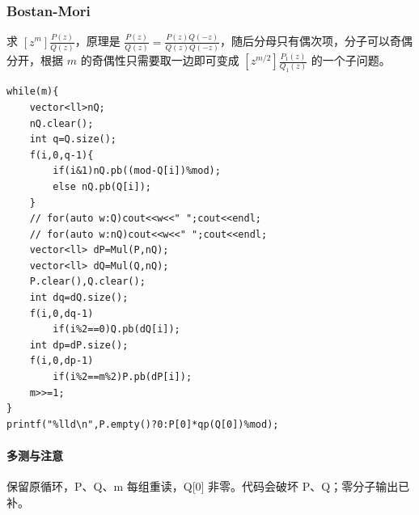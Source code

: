 \subsubsection{Bostan-Mori}

求 $[z^m]\frac{P(z)}{Q(z)}$，原理是 $\frac{P(z)}{Q(z)}=\frac{P(z)Q(-z)}{Q(z)Q(-z)}$，随后分母只有偶次项，分子可以奇偶分开，根据 $m$ 的奇偶性只需要取一边即可变成 $[z^{m/2}]\frac{P_1(z)}{Q_1(z)}$ 的一个子问题。

\begin{lstlisting}
while(m){
	vector<ll>nQ;
	nQ.clear();
	int q=Q.size();
	f(i,0,q-1){
		if(i&1)nQ.pb((mod-Q[i])%mod);
		else nQ.pb(Q[i]);
	}
	// for(auto w:Q)cout<<w<<" ";cout<<endl;
	// for(auto w:nQ)cout<<w<<" ";cout<<endl;
	vector<ll> dP=Mul(P,nQ);
	vector<ll> dQ=Mul(Q,nQ);
	P.clear(),Q.clear();
	int dq=dQ.size();
	f(i,0,dq-1)
		if(i%2==0)Q.pb(dQ[i]);
	int dp=dP.size();
	f(i,0,dp-1)
		if(i%2==m%2)P.pb(dP[i]);
	m>>=1;
}
printf("%lld\n",P.empty()?0:P[0]*qp(Q[0])%mod);
\end{lstlisting}

\paragraph{多测与注意} 保留原循环，P、Q、m 每组重读，Q[0] 非零。代码会破坏 P、Q；零分子输出已补。
